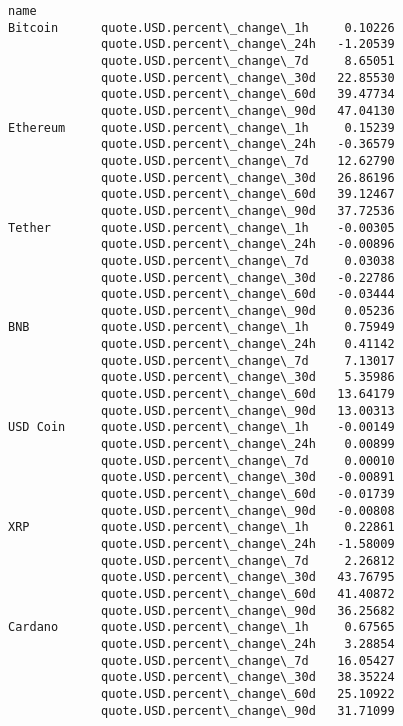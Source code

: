 \documentclass[11pt]{article}
\makeatletter
\newcommand{\boxspacing}{\kern\kvtcb@left@rule\kern\kvtcb@boxsep}
\newcommand{\prompt}[4]{
        {\ttfamily\llap{{\color{#2}[#3]:\hspace{3pt}#4}}\vspace{-\baselineskip}}
    }
\makeatother
\begin{document}
            \begin{tcolorbox}[breakable, size=fbox, boxrule=.5pt, pad at break*=1mm, opacityfill=0]
\prompt{Out}{outcolor}{51}{\boxspacing}
\begin{Verbatim}[commandchars=\\\{\}]
name
Bitcoin      quote.USD.percent\_change\_1h     0.10226
             quote.USD.percent\_change\_24h   -1.20539
             quote.USD.percent\_change\_7d     8.65051
             quote.USD.percent\_change\_30d   22.85530
             quote.USD.percent\_change\_60d   39.47734
             quote.USD.percent\_change\_90d   47.04130
Ethereum     quote.USD.percent\_change\_1h     0.15239
             quote.USD.percent\_change\_24h   -0.36579
             quote.USD.percent\_change\_7d    12.62790
             quote.USD.percent\_change\_30d   26.86196
             quote.USD.percent\_change\_60d   39.12467
             quote.USD.percent\_change\_90d   37.72536
Tether       quote.USD.percent\_change\_1h    -0.00305
             quote.USD.percent\_change\_24h   -0.00896
             quote.USD.percent\_change\_7d     0.03038
             quote.USD.percent\_change\_30d   -0.22786
             quote.USD.percent\_change\_60d   -0.03444
             quote.USD.percent\_change\_90d    0.05236
BNB          quote.USD.percent\_change\_1h     0.75949
             quote.USD.percent\_change\_24h    0.41142
             quote.USD.percent\_change\_7d     7.13017
             quote.USD.percent\_change\_30d    5.35986
             quote.USD.percent\_change\_60d   13.64179
             quote.USD.percent\_change\_90d   13.00313
USD Coin     quote.USD.percent\_change\_1h    -0.00149
             quote.USD.percent\_change\_24h    0.00899
             quote.USD.percent\_change\_7d     0.00010
             quote.USD.percent\_change\_30d   -0.00891
             quote.USD.percent\_change\_60d   -0.01739
             quote.USD.percent\_change\_90d   -0.00808
XRP          quote.USD.percent\_change\_1h     0.22861
             quote.USD.percent\_change\_24h   -1.58009
             quote.USD.percent\_change\_7d     2.26812
             quote.USD.percent\_change\_30d   43.76795
             quote.USD.percent\_change\_60d   41.40872
             quote.USD.percent\_change\_90d   36.25682
Cardano      quote.USD.percent\_change\_1h     0.67565
             quote.USD.percent\_change\_24h    3.28854
             quote.USD.percent\_change\_7d    16.05427
             quote.USD.percent\_change\_30d   38.35224
             quote.USD.percent\_change\_60d   25.10922
             quote.USD.percent\_change\_90d   31.71099

\end{Verbatim}
\end{tcolorbox}
\end{document}
